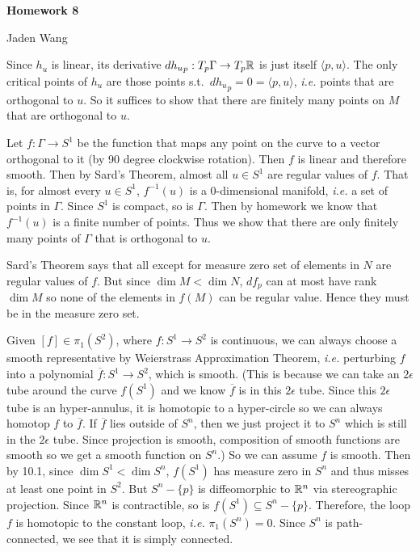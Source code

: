 \documentclass[12pt]{article}
\begin{document}
\centerline {\textsf{\textbf{\LARGE{Homework 8}}}}
\centerline {Jaden Wang}
\vspace{.15in}
\begin{problem}[9.14]
	Since $ h_u$ is linear, its derivative  $ {d h_u} _p : T_p \Gamma \to T_p \mathbb{R}$ is just itself  $ \langle p,u \rangle$. The only critical points of $ h_u$ are those points s.t.\ $ {dh_u}_p = 0 = \langle p,u \rangle$, \emph{i.e.} points that are orthogonal to $ u$. So it suffices to show that there are finitely many points on $ M$ that are orthogonal to  $ u$.

	Let $ f: \Gamma \to S^{1}$ be the function that maps any point on the curve to a vector orthogonal to it (by 90 degree clockwise rotation). Then $ f$ is linear and therefore smooth. Then by Sard's Theorem, almost all  $ u \in S^{1}$ are regular values of $ f$. That is, for almost every  $ u \in S^{1}$, $ f^{-1}(u)$ is a 0-dimensional manifold, \emph{i.e.} a set of points in $ \Gamma$.  Since $ S^{1}$ is compact, so is $ \Gamma$. Then by homework we know that $ f^{-1}(u)$ is a finite number of points. Thus we show that there are only finitely many points of $ \Gamma$ that is orthogonal to $ u$.
\end{problem}
\begin{problem}[10.1]
Sard's Theorem says that all except for measure zero set of elements in $ N$ are regular values of $ f$. But since $ \dim M < \dim N$, $ df_p$ can at most have rank  $ \dim M$ so none of the elements in $ f(M)$  can be regular value. Hence they must be in the measure zero set.
\end{problem}

\begin{problem}[10.2]
	Given $ [f] \in \pi_1(S^2)$, where $ f: S^{1} \to S^2$ is continuous, we can always choose a smooth representative by Weierstrass Approximation Theorem, \emph{i.e.}  perturbing $ f$ into a polynomial  $ \overline{f}: S^{1} \to S^2$, which is smooth. (This is because we can take an $ 2 \epsilon$ tube around the curve $ f(S^{1})$ and we know $ \overline{f}$ is in this $ 2 \epsilon$ tube. Since this $ 2 \epsilon$ tube is an hyper-annulus, it is homotopic to a hyper-circle so we can always homotop $ f$ to  $ \overline{f}$. If $ \overline{f}$ lies outside of $ S^n$, then we just project it to $ S^n$ which is still in the $ 2 \epsilon$ tube. Since projection is smooth, composition of smooth functions are smooth so we get a smooth function on $ S^n$.) So we can assume $ f$ is smooth. Then by 10.1, since $ \dim S^{1} < \dim S^{n}$, $ f(S^{1})$ has measure zero in $ S^n$ and thus misses at least one point in $ S^2$. But $ S^n - \{p\} $ is diffeomorphic to $ \mathbb{R}^n$ via stereographic projection. Since $ \mathbb{R}^n$ is contractible, so is $ f(S^{1}) \subseteq S^n - \{p\} $. Therefore, the loop $ f$ is homotopic to the constant loop, \emph{i.e.} $ \pi_1(S^n) = 0$. Since $ S^n$ is path-connected, we see that it is simply connected. 
\end{problem}
\end{document}
